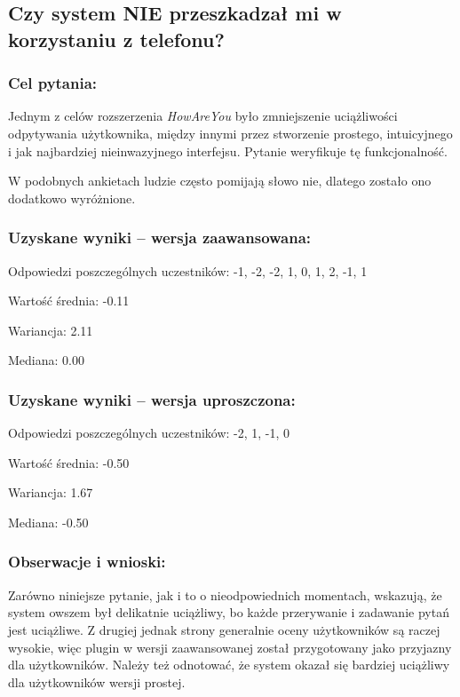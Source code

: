 	
\subsection{Czy system NIE przeszkadzał mi w korzystaniu z telefonu?}
	
	\subsubsection{Cel pytania:}
	
	Jednym z celów rozszerzenia \textit{HowAreYou} było zmniejszenie uciążliwości odpytywania użytkownika, między innymi przez stworzenie prostego, intuicyjnego i jak najbardziej nieinwazyjnego interfejsu. Pytanie weryfikuje tę funkcjonalność.
	
	W podobnych ankietach ludzie często pomijają słowo nie, dlatego zostało ono dodatkowo wyróżnione.
	
	\subsubsection{Uzyskane wyniki -- wersja zaawansowana:}
	
	Odpowiedzi poszczególnych uczestników: -1, -2, -2, 1, 0, 1, 2, -1, 1
	
	Wartość średnia: -0.11
	
	Wariancja: 2.11
	
	Mediana: 0.00
	
	\subsubsection{Uzyskane wyniki -- wersja uproszczona:}
	
	Odpowiedzi poszczególnych uczestników: -2, 1, -1, 0
	
	Wartość średnia: -0.50
	
	Wariancja: 1.67
	
	Mediana: -0.50
	
	\subsubsection{Obserwacje i wnioski:}
	
	Zarówno niniejsze pytanie, jak i to o nieodpowiednich momentach, wskazują, że system owszem był delikatnie uciążliwy, bo każde przerywanie i zadawanie pytań jest uciążliwe. Z drugiej jednak strony generalnie oceny użytkowników są raczej wysokie, więc plugin w wersji zaawansowanej został przygotowany jako przyjazny dla użytkowników. Należy też odnotować, że system okazał się bardziej uciążliwy dla użytkowników wersji prostej.
	
